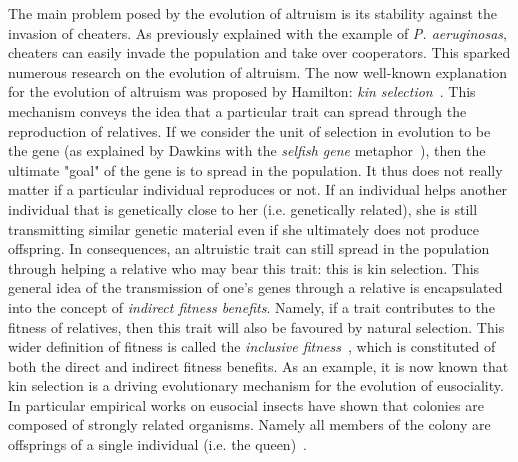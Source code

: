     The main problem posed by the evolution of altruism is its stability against the invasion of cheaters. As previously explained with the example of \emph{P. aeruginosas}, cheaters can easily invade the population and take over cooperators. This sparked numerous research on the evolution of altruism. The now well-known explanation for the evolution of altruism was proposed by Hamilton: \emph{kin selection}~\parencite{Hamilton1964}. This mechanism conveys the idea that a particular trait can spread through the reproduction of relatives. If we consider the unit of selection in evolution to be the gene (as explained by Dawkins with the \emph{selfish gene} metaphor~\parencite{Dawkins1976}), then the ultimate "goal" of the gene is to spread in the population. It thus does not really matter if a particular individual reproduces or not. If an individual helps another individual that is genetically close to her (i.e. genetically related), she is still transmitting similar genetic material even if she ultimately does not produce offspring. In consequences, an altruistic trait can still spread in the population through helping a relative who may bear this trait: this is kin selection. This general idea of the transmission of one's genes through a relative is encapsulated into the concept of \emph{indirect fitness benefits}. Namely, if a trait contributes to the fitness of relatives, then this trait will also be favoured by natural selection. This wider definition of fitness is called the \emph{inclusive fitness}~\parencite{Grafen1984}, which is constituted of both the direct and indirect fitness benefits. As an example, it is now known that kin selection is a driving evolutionary mechanism for the evolution of eusociality. In particular empirical works on eusocial insects have shown that colonies are composed of strongly related organisms. Namely all members of the colony are offsprings of a single individual (i.e. the queen)~\parencite{Queller1998, Bourke2014}.





